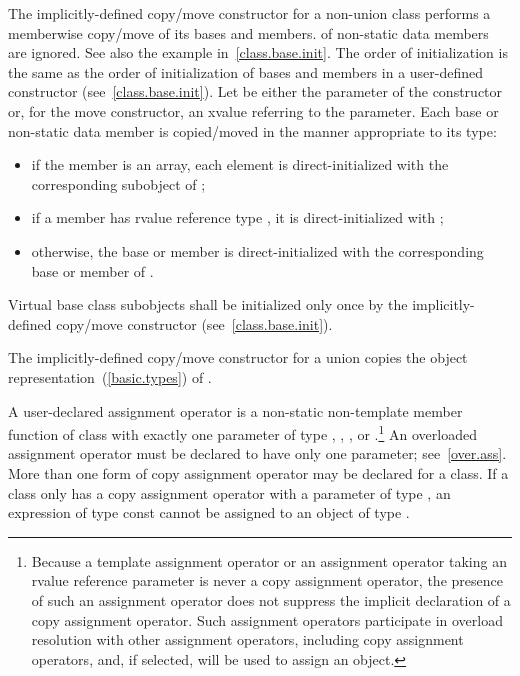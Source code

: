 \pnum
The implicitly-defined copy/move constructor for a non-union class
performs a memberwise copy/move of its bases and members.
\enternote {} of non-static data members are ignored. See also the example in~\ref{class.base.init}. \exitnote
The order of initialization is the same as the order of initialization of bases
and members in a user-defined constructor (see~\ref{class.base.init}).
Let  be either the parameter of the constructor or, for the move constructor, an
xvalue referring to the parameter.
Each base or non-static data member
is copied/moved in the manner appropriate to its type:

\begin{itemize}
\item
if the member is an array, each element is
direct-initialized with the corresponding subobject of ;

\item
if a member  has rvalue reference type , it is direct-initialized with
;

\item
otherwise, the base or member is direct-initialized with the corresponding base or member of .
\end{itemize}

%
Virtual base class subobjects shall be initialized only once by
the implicitly-defined copy/move constructor (see~\ref{class.base.init}).

\pnum
The implicitly-defined copy/move constructor for a union
 copies the object representation~(\ref{basic.types}) of .%
%

\pnum
{}%
%
A user-declared  assignment operator  is a
non-static non-template member function of class  with exactly one
parameter of type , ,  ,
  or  
.\footnote{Because a template assignment operator or an assignment
operator taking an rvalue reference parameter is never a copy assignment
operator, the presence of such an assignment operator does not suppress the
implicit declaration of a copy assignment operator. Such assignment operators
participate in overload resolution with other assignment operators, including
copy assignment operators, and, if selected, will be used to assign an object.}
\enternote
An overloaded assignment operator must be declared to have only one parameter;
see~\ref{over.ass}.
\exitnote
\enternote
More than one form of copy assignment operator may be declared for a class.
\exitnote
\enternote
If a class
only has a copy assignment operator with a parameter of type
,
an expression of type const
cannot be assigned to an object of type
.
\enterexample


